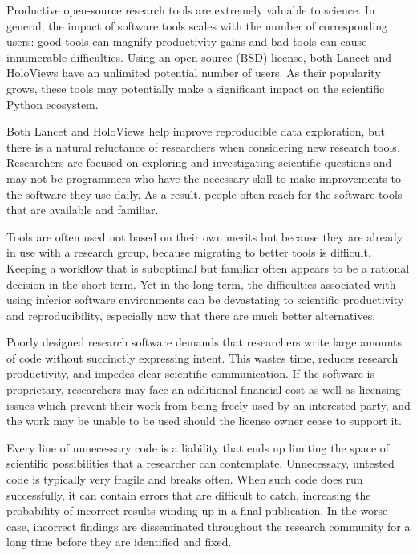 \documentclass[phd,ianc,twoside]{infthesis}
\begin{document}
Productive open-source research tools are extremely valuable to
science. In general, the impact of software tools scales with the number
of corresponding users: good tools can magnify productivity gains and
bad tools can cause innumerable difficulties. Using an open source (BSD)
license, both Lancet and HoloViews have an unlimited potential number
of users. As their popularity grows, these tools may potentially make
a significant impact on the scientific Python ecosystem.

Both Lancet and HoloViews help improve reproducible data exploration, 
but there is a natural reluctance of researchers when considering new
research tools. Researchers are focused on exploring and investigating
scientific questions and may not be programmers who have the necessary
skill to make improvements to the software they use daily. As a
result, people often reach for the 
software tools that are available and familiar.

Tools are often used not based on their own merits but because they
are already in use with a research group, because migrating to better
tools is difficult. Keeping a workflow that is suboptimal but familiar
often appears to be a rational decision in the short term. Yet in the
long term, the difficulties associated with using inferior software
environments can be devastating to scientific productivity and
reproducibility, especially now that there are much better
alternatives.

Poorly designed research software demands that researchers write large
amounts of code without succinctly expressing intent. This wastes time,
reduces research productivity, and impedes clear scientific
communication. If the software is proprietary, researchers may face an
additional financial cost as well as licensing issues which prevent their work
from being freely used by an interested party, and the work may be
unable to be used should the license owner cease to support it.

Every line of unnecessary code is a liability that ends up limiting the space of
scientific possibilities that a researcher can contemplate. Unnecessary,
untested code is typically very fragile and breaks often. When such code does run
successfully, it can contain errors that are difficult to catch,
increasing the probability of incorrect results winding up in a final
publication. In the worse case, incorrect findings
are disseminated throughout the research community for a long time
before they are identified and fixed.
\end{document}
